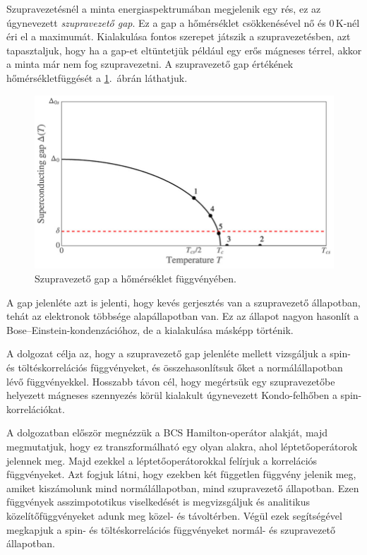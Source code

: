 \documentclass[a4paper,12pt,titlepage]{article}
\begin{document}
Szupravezetésnél a minta energiaspektrumában megjelenik egy rés, ez az úgynevezett \emph{szupravezető gap}.  Ez a gap a hőmérséklet csökkenésével nő és $0$\,K-nél éri el a maximumát.  Kialakulása fontos szerepet játszik a szupravezetésben, azt tapasztaljuk, hogy ha a gap-et eltüntetjük például egy erős mágneses térrel, akkor a minta már nem fog szupravezetni.  A szupravezető gap értékének hőmérsékletfüggését a \ref{sc-gap}.\ ábrán láthatjuk.

\begin{figure}[h!]
	\centering
	\includegraphics[width=12cm]{sc_gap.png}
	\caption[]{Szupravezető gap a hőmérséklet függvényében.\footnotemark}
	\label{sc-gap}
\end{figure}

A gap jelenléte azt is jelenti, hogy kevés gerjesztés van a szupravezető állapotban, tehát az elektronok többsége alapállapotban van.  Ez az állapot nagyon hasonlít a Bose--Einstein-kondenzációhoz, de a kialakulása másképp történik.

\newpage
A dolgozat célja az, hogy a szupravezető gap jelenléte mellett vizsgáljuk a spin- és töltéskorrelációs függvényeket, és összehasonlítsuk őket a normálállapotban lévő függvényekkel.  Hosszabb távon cél, hogy megértsük egy szupravezetőbe helyezett mágneses szennyezés körül kialakult úgynevezett Kondo-felhőben a spin-korrelációkat.

A dolgozatban először megnézzük a BCS Hamilton-operátor alakját, majd megmutatjuk, hogy ez transzformálható egy olyan alakra, ahol léptetőoperátorok jelennek meg.  Majd ezekkel a léptetőoperátorokkal felírjuk a korrelációs függvényeket.  Azt fogjuk látni, hogy ezekben két független függvény jelenik meg, amiket kiszámolunk mind normálállapotban, mind szupravezető állapotban.  Ezen függvények asszimpototikus viselkedését is megvizsgáljuk és analitikus közelítőfüggvényeket adunk meg közel- és távoltérben.  Végül ezek segítségével megkapjuk a spin- és töltéskorrelációs függvényeket normál- és szupravezető állapotban.
\end{document}

